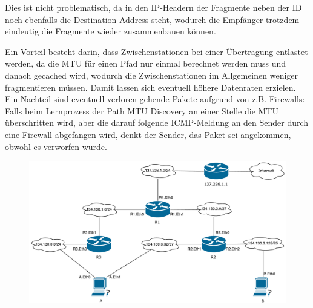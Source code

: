 \documentclass{../exercisesheet}
\begin{document}
\begin{exercise}{6}
\begin{subexercise}
\end{subexercise}
\begin{subexercise}
Dies ist nicht problematisch, da in den IP-Headern der Fragmente neben der ID noch ebenfalls die Destination Address steht, wodurch die Empfänger trotzdem eindeutig die Fragmente
wieder zusammenbauen können.
\end{subexercise}
\begin{subexercise}
Ein Vorteil besteht darin, dass Zwischenstationen bei einer Übertragung entlastet werden, da die MTU für einen Pfad nur einmal berechnet werden muss und danach gecached wird, 
wodurch die Zwischenstationen im Allgemeinen weniger fragmentieren müssen. Damit lassen sich eventuell höhere Datenraten erzielen.\\
Ein Nachteil sind eventuell verloren gehende Pakete aufgrund von z.B. Firewalls: Falls beim Lernprozess der Path MTU Discovery an einer Stelle die MTU überschritten wird, aber
die darauf folgende ICMP-Meldung an den Sender durch eine Firewall abgefangen wird, denkt der Sender, das Paket sei angekommen, obwohl es verworfen wurde.
\end{subexercise}
\end{exercise}


\begin{exercise}{5}
\begin{subexercise}
\begin{figure}[H]
  \centering
  \includegraphics[width=\textwidth]{a3_network.pdf}
\end{figure}
\end{subexercise}
\begin{subexercise}
\end{subexercise}
\end{exercise}
\end{document}

